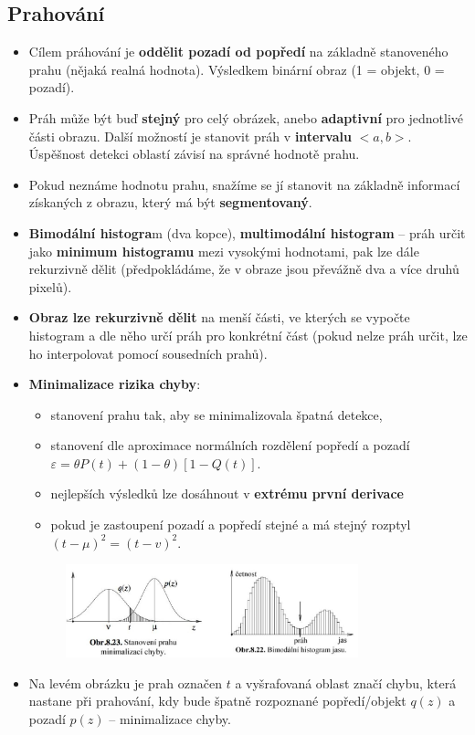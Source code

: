 
\subsection{Prahování}
\begin{itemize}
	\item Cílem práhování je \textbf{oddělit pozadí od popředí} na základně stanoveného prahu (nějaká realná hodnota). Výsledkem binární obraz (1 = objekt, 0 = pozadí).
	\item Práh může být buď \textbf{stejný} pro celý obrázek, anebo \textbf{adaptivní} pro jednotlivé části obrazu. Další možností je stanovit práh v \textbf{intervalu} $<a, b>$. Úspěšnost detekci oblastí závisí na správné hodnotě prahu.
	\item Pokud neznáme hodnotu prahu, snažíme se jí stanovit na základně informací získaných z obrazu, který má být \textbf{segmentovaný}.
	\item \textbf{Bimodální histogra}m (dva kopce), \textbf{multimodální histogram }-- práh určit jako \textbf{minimum histogramu} mezi vysokými hodnotami, pak lze dále rekurzivně dělit (předpokládáme, že v obraze jsou převážně dva a více druhů pixelů).
	\item \textbf{Obraz lze rekurzivně dělit} na menší části, ve kterých se vypočte histogram a dle něho určí práh pro konkrétní část (pokud nelze práh určit, lze ho interpolovat pomocí sousedních prahů).
	\item \textbf{Minimalizace rizika chyby}:
	\begin{itemize}
		\item stanovení prahu tak, aby se minimalizovala špatná detekce,
		\item stanovení dle aproximace normálních rozdělení popředí a pozadí \\$\varepsilon = \theta P(t) + (1 - \theta)[1 - Q(t)]$.
		\item nejlepších výsledků lze dosáhnout v \textbf{extrému první derivace}
		\item pokud je zastoupení pozadí a popředí stejné a má stejný rozptyl $(t - \mu )^2 = (t - v)^2 $.
	\end{itemize}
	\begin{figure}[H]
\centering
\includegraphics[width=0.8\textwidth]{assets/8_prah_histogram}
\end{figure}
\item Na levém obrázku je prah označen $t$ a vyšrafovaná oblast značí chybu, která nastane při prahování, kdy bude špatně rozpoznané popředí/objekt $q(z)$ a pozadí $p(z)$ -- minimalizace chyby. 
\end{itemize}


